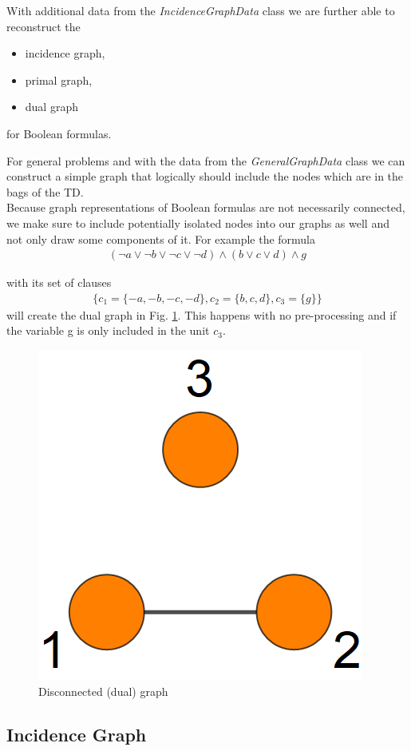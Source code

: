 \documentclass[a4paper, 12pt, bibliography=totoc]{scrartcl}
\begin{document}
With additional data from the \textit{IncidenceGraphData} class we are further able to reconstruct the
\begin{itemize}
	\item incidence graph,
	\item primal graph,
	\item dual graph
\end{itemize}
for Boolean formulas.

For general problems and with the data from the \textit{GeneralGraphData} class we can construct a simple graph that logically should include the nodes which are in the bags of the TD.\\
Because graph representations of Boolean formulas are not necessarily connected, we make sure to include potentially isolated nodes into our graphs as well and not only draw some components of it.
For example the formula 
\begin{gather*}
(\neg a\lor \neg b\lor \neg c\lor \neg d)\land (b\lor c\lor d)\land g
\end{gather*}

with its set of clauses 
\begin{gather*}\{c_{1}=\{-a,-b,-c,-d\},c_{2}=\{b,c,d\},c_{3}=\{g\}\}\end{gather*}
will create the dual graph in Fig. \ref{fig:disconnected123}. This happens with no pre-processing and if the variable g is only included in the unit $c_{3}$.

\begin{figure}[H]
	\centering
	\includegraphics[width=0.3\linewidth]{images/disconnected123.png}
	\caption{Disconnected (dual) graph}
	\label{fig:disconnected123}
\end{figure}

\subsection{Incidence Graph}\label{sec:incid}
\end{document}
